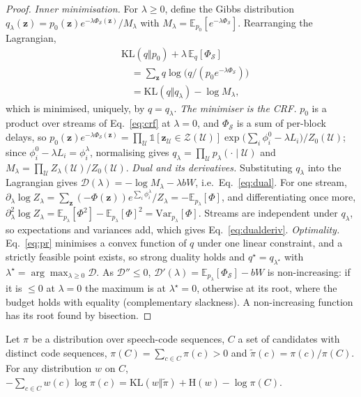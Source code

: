 \begin{proof}
\emph{Inner minimisation.} For $\lambda\ge0$, define the Gibbs distribution
$q_\lambda(\bm{z})=p_0(\bm{z})e^{-\lambda\Phi_\mathcal{S}(\bm{z})}/M_\lambda$ with $M_\lambda=\mathbb{E}_{p_0}[e^{-\lambda\Phi_\mathcal{S}}]$.
Rearranging the Lagrangian,
\[
\begin{aligned}
&\mathrm{KL}(q\Vert p_0)+\lambda\,\mathbb{E}_q[\Phi_\mathcal{S}]\\
&\quad=\textstyle\sum_{\bm{z}}q\log\big(q/(p_0e^{-\lambda\Phi_\mathcal{S}})\big)\\
&\quad=\mathrm{KL}(q\Vert q_\lambda)-\log M_\lambda ,
\end{aligned}
\]
which is minimised, uniquely, by $q=q_\lambda$.
\emph{The minimiser is the CRF.} $p_0$ is a product over streams of Eq.~\eqref{eq:crf} at $\lambda=0$, and
$\Phi_\mathcal{S}$ is a sum of per-block delays, so
$p_0(\bm{z})e^{-\lambda\Phi_\mathcal{S}(\bm{z})}=\prod_{\mathcal{U}}\mathds{1}[\bm{z}_{\mathcal{U}}\in\mathcal{Z}(\mathcal{U})]\exp\big(\sum_i\phi^0_i-\lambda L_i\big)/Z_0(\mathcal{U})$;
since $\phi^0_i-\lambda L_i=\phi^\lambda_i$, normalising gives $q_\lambda=\prod_{\mathcal{U}}p_\lambda(\cdot\mid\mathcal{U})$ and
$M_\lambda=\prod_{\mathcal{U}}Z_\lambda(\mathcal{U})/Z_0(\mathcal{U})$.
\emph{Dual and its derivatives.} Substituting $q_\lambda$ into the Lagrangian gives
$\mathcal{D}(\lambda)=-\log M_\lambda-\lambda bW$, i.e.\ Eq.~\eqref{eq:dual}. For one stream,
$\partial_\lambda\log Z_\lambda=\sum_{\bm{z}}(-\Phi(\bm{z}))e^{\sum_i\phi^\lambda_i}/Z_\lambda=-\mathbb{E}_{p_\lambda}[\Phi]$, and
differentiating once more, $\partial^2_\lambda\log Z_\lambda=\mathbb{E}_{p_\lambda}[\Phi^2]-\mathbb{E}_{p_\lambda}[\Phi]^2=\mathrm{Var}_{p_\lambda}[\Phi]$.
Streams are independent under $q_\lambda$, so expectations and variances add, which gives Eq.~\eqref{eq:dualderiv}.
\emph{Optimality.} Eq.~\eqref{eq:pr} minimises a convex function of $q$ under one linear constraint, and a strictly
feasible point exists, so strong duality holds and $q^\star=q_{\lambda^\star}$ with $\lambda^\star=\arg\max_{\lambda\ge0}\mathcal{D}$.
As $\mathcal{D}''\le0$, $\mathcal{D}'(\lambda)=\mathbb{E}_{p_\lambda}[\Phi_\mathcal{S}]-bW$ is non-increasing: if it is
$\le0$ at $\lambda=0$ the maximum is at $\lambda^\star=0$, otherwise at its root, where the budget holds with equality
(complementary slackness). A non-increasing function has its root found by bisection.
\end{proof}

\begin{proposition}
\label{prop:patrain}
Let $\pi$ be a distribution over speech-code sequences, $C$ a set of candidates with distinct code sequences,
$\pi(C)=\sum_{c\in C}\pi(c)>0$ and $\tilde{\pi}(c)=\pi(c)/\pi(C)$. For any distribution $w$ on $C$,
$-\sum_{c\in C}w(c)\log\pi(c)=\mathrm{KL}(w\Vert\tilde{\pi})+\mathrm{H}(w)-\log\pi(C)$.
\end{proposition}

